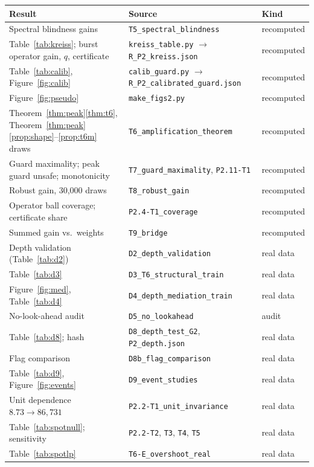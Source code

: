 \documentclass[12pt]{article}
\theoremstyle{definition}
\theoremstyle{remark}
\begin{document}
\begin{longtable}{p{}p{}p{}}
\toprule
Result & Source & Kind\\
\midrule
\endhead
Spectral blindness gains & \texttt{T5\_spectral\_blindness} & recomputed\\
Table~\ref{tab:kreiss}; burst operator gain, $q$, certificate & \texttt{kreiss\_table.py} $\to$ \texttt{R\_P2\_kreiss.json} & recomputed\\
Table~\ref{tab:calib}, Figure~\ref{fig:calib} & \texttt{calib\_guard.py} $\to$ \texttt{R\_P2\_calibrated\_guard.json} & recomputed\\
Figure~\ref{fig:pseudo} & \texttt{make\_figs2.py} & recomputed\\
Theorem~\ref{thm:peak}\ref{thm:t6}, Theorem~\ref{thm:peak}\ref{prop:shape}--\ref{prop:t6m} draws & \texttt{T6\_amplification\_theorem} & recomputed\\
Guard maximality; peak guard unsafe; monotonicity & \texttt{T7\_guard\_maximality}, \texttt{P2.11-T1} & recomputed\\
Robust gain, 30,000 draws & \texttt{T8\_robust\_gain} & recomputed\\
Operator ball coverage; certificate share & \texttt{P2.4-T1\_coverage} & recomputed\\
Summed gain vs.\ weights & \texttt{T9\_bridge} & recomputed\\
Depth validation (Table~\ref{tab:d2}) & \texttt{D2\_depth\_validation} & real data\\
Table~\ref{tab:d3} & \texttt{D3\_T6\_structural\_train} & real data\\
Figure~\ref{fig:med}, Table~\ref{tab:d4} & \texttt{D4\_depth\_mediation\_train} & real data\\
No-look-ahead audit & \texttt{D5\_no\_lookahead} & audit\\
Table~\ref{tab:d8}; hash & \texttt{D8\_depth\_test\_G2}, \texttt{P2\_depth.json} & real data\\
Flag comparison & \texttt{D8b\_flag\_comparison} & real data\\
Table~\ref{tab:d9}, Figure~\ref{fig:events} & \texttt{D9\_event\_studies} & real data\\
Unit dependence $8.73\to86{,}731$ & \texttt{P2.2-T1\_unit\_invariance} & real data\\
Table~\ref{tab:spotnull}; sensitivity & \texttt{P2.2-T2}, \texttt{T3}, \texttt{T4}, \texttt{T5} & real data\\
Table~\ref{tab:spotlp} & \texttt{T6-E\_overshoot\_real} & real data\\

\end{longtable}
\end{document}
